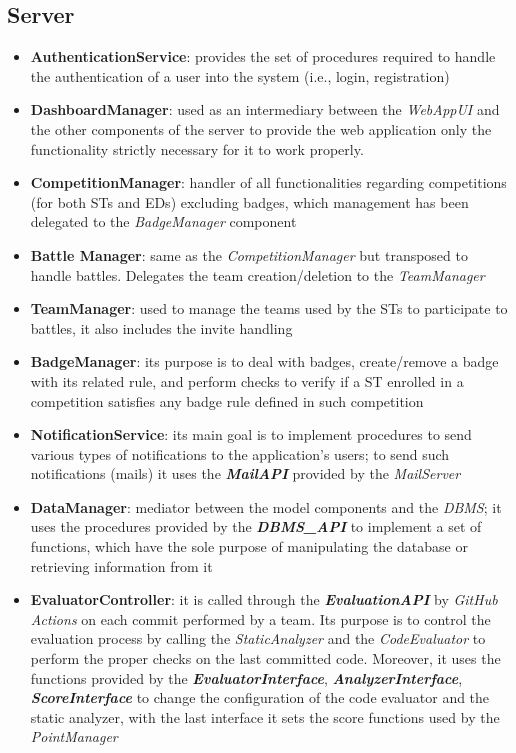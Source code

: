 \subsection*{Server}
\begin{itemize}
  \item \textbf{AuthenticationService}: provides the set of procedures required to handle the authentication of a user into the system (i.e., login, registration)
  \item \textbf{DashboardManager}: used as an intermediary between the \textit{WebAppUI} and the other components of the server to provide the web application only the functionality strictly necessary for it to work properly.
  \item \textbf{CompetitionManager}: handler of all functionalities regarding competitions (for both STs and EDs) excluding badges, which management has been delegated to the \textit{BadgeManager} component
  \item \textbf{Battle Manager}: same as the \textit{CompetitionManager} but transposed to handle battles. Delegates the team creation/deletion to the \textit{TeamManager}
  \item \textbf{TeamManager}: used to manage the teams used by the STs to participate to battles, it also includes the invite handling
  \item \textbf{BadgeManager}: its purpose is to deal with badges, create/remove a badge with its related rule, and perform checks to verify if a ST enrolled in a competition satisfies any badge rule defined in such competition
  \item \textbf{NotificationService}: its main goal is to implement procedures to send various types of notifications to the application's users; to send such notifications (mails) it uses the \textbf{\textit{MailAPI}} provided by the \textit{MailServer}
  \item \textbf{DataManager}: mediator between the model components and the \textit{DBMS}; it uses the procedures provided by the \textbf{\textit{DBMS\_API}} to implement a set of functions, which have the sole purpose of manipulating the database or retrieving information from it
  \item \textbf{EvaluatorController}: it is called through the \textbf{\textit{EvaluationAPI}} by \textit{GitHub Actions} on each commit performed by a team. Its purpose is to control the evaluation process by calling the \textit{StaticAnalyzer} and the \textit{CodeEvaluator} to perform the proper checks on the last committed code. Moreover, it uses the functions provided by the \textbf{\textit{EvaluatorInterface}}, \textbf{\textit{AnalyzerInterface}}, \textbf{\textit{ScoreInterface}} to change the configuration of the code evaluator and the static analyzer, with the last interface it sets the score functions used by the \textit{PointManager}

\end{itemize}
